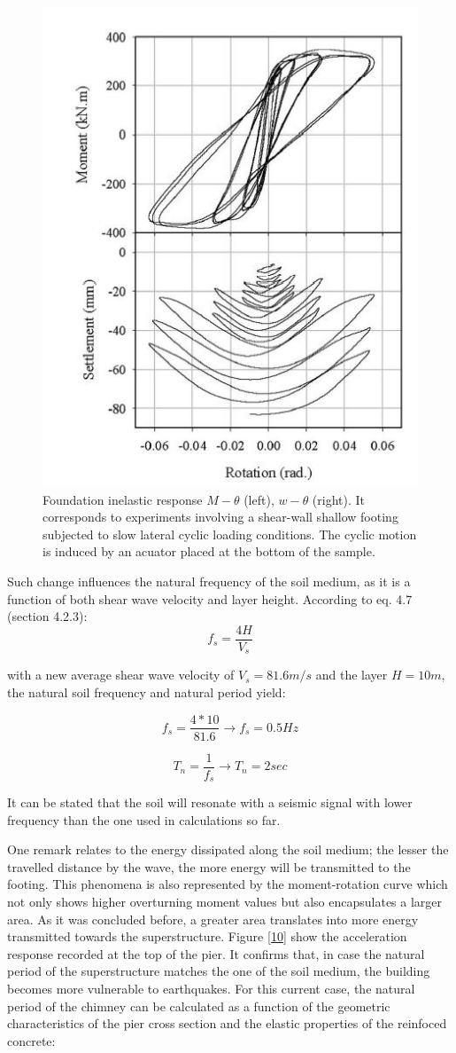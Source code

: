  \begin{figure}[!h]
 	\centering
 	\includegraphics[width=0.5 \linewidth]{"gazetas"}
 	\caption{Foundation inelastic response $M-\theta$ (left), $w-\theta$ (right). It corresponds to experiments involving a shear-wall shallow footing subjected to slow lateral cyclic loading conditions. The cyclic motion is induced by an acuator placed at the bottom of the sample.}
 	\label{gaza}
 \end{figure}

Such change influences the natural frequency of the soil medium, as it is a function of both shear wave velocity and layer height. According to eq. 4.7 (section 4.2.3):
\begin{equation}
	f_s=\frac{4H}{V_s}
\end{equation}

with a new average shear wave velocity of $V_s=81.6 m/s$ and the layer $H=10m$, the natural soil frequency and natural period yield:

\begin{equation}
	f_s=\frac{4*10}{81.6} \longrightarrow f_s=0.5 Hz
\end{equation}
 
 \begin{equation}
 	T_n=\frac{1}{f_s} \longrightarrow T_n=2 sec
 \end{equation}

It can be stated that the soil will resonate with a seismic signal with lower frequency than the one used in calculations so far.

One remark relates to the energy dissipated along the soil medium; the lesser the travelled distance by the wave, the more energy will be transmitted to the footing. This phenomena is also represented by the moment-rotation curve which not only shows higher overturning moment values but also encapsulates a larger area. As it was concluded before, a greater area translates into more energy transmitted towards the superstructure. Figure \ref{10} show the acceleration response recorded at the top of the pier. It confirms that, in case the natural period of the superstructure matches the one of the soil medium, the building becomes more vulnerable to earthquakes. For this current case, the natural period of the chimney can be calculated as a function of the geometric characteristics of the pier cross section and the elastic properties of the reinfoced concrete:

